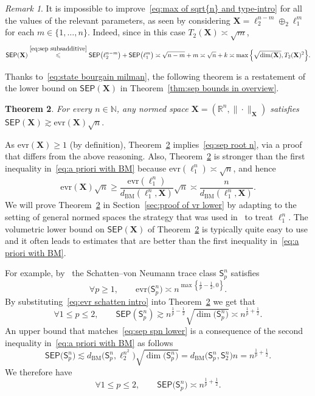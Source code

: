 \documentclass[11pt,reqno]{amsart}
\renewcommand{\le}{\leqslant}
\renewcommand{\ge}{\geqslant}
\newcommand{\evr}{\mathrm{evr}}
\newcommand{\n}{\{1,\ldots,n\}}
\newcommand{\X}{\mathbf X}
\newcommand{\R}{\mathbb R}
\newtheorem{theorem}{Theorem}
\theoremstyle{remark}
\newtheorem{remark}[theorem]{Remark}
\newcommand{\sfS}{\mathsf{S}}
\newcommand{\N}{\mathbb N}
\newcommand{\BM}{\mathrm{BM}}
\renewcommand{\1}{\mathbf 1}
\newcommand{\sep}{\mathsf{SEP}}
\begin{document}
\begin{remark} It is impossible to improve~\eqref{eq:max of sqrt{n} and type-intro} for all the values of the relevant parameters, as seen  by considering $\X=\ell_{2}^{n-m}\oplus_2\ell_1^m$ for each $m\in\n$. Indeed, since in this case $T_2(\X)\asymp \sqrt{m}$,
$$
\sep(\X)\stackrel{\eqref{eq:sep subsadditive}}{\le} \sep\big(\ell_2^{n-m}\big)+\sep\big(\ell_1^m\big)\asymp \sqrt{n-m}+m\asymp \sqrt{n}+k\asymp \max\Big\{\sqrt{\dim(\X)},T_2(\X)^2\Big\}.
$$
\end{remark}

Thanks to~\eqref{eq:state bourgain milman}, the following theorem is a restatement of the lower bound on $\sep(\X)$ in Theorem~\ref{thm:sep bounds in overview}.

\begin{theorem}\label{thm:sep lower evr} For every $n\in \N$, any normed space $\X=(\R^n,\|\cdot\|_\X)$ satisfies $\sep(\X)\gtrsim \evr(\X)\sqrt{n}.
$
\end{theorem}
As $\evr(\X)\ge 1$ (by definition), Theorem~\ref{thm:sep lower evr}  implies~\eqref{eq:sep root n}, via a  proof that differs from the above reasoning. Also, Theorem~\ref{thm:sep lower evr} is stronger than the first inequality in~\eqref{eq:a priori with BM} because $\evr(\ell_1^n)\asymp \sqrt{n}$, and hence
$$
\evr(\X)\sqrt{n}\ge \frac{\evr(\ell_1^n)}{d_{\BM}(\ell_1^n,\X)}\sqrt{n}\asymp \frac{n}{d_{\BM}(\ell_1^n,\X)}.
$$
We will prove Theorem~\ref{thm:sep lower evr} in Section~\ref{sec:proof of vr lower} by adapting to the setting of general normed spaces the strategy that was used in~\cite{CCGGP98} to treat $\ell_1^n$. The volumetric lower bound on $\sep(\X)$ of Theorem~\ref{thm:sep lower evr} is typically quite easy to use and it often leads to  estimates that are better than the first inequality in~\eqref{eq:a priori with BM}.

For example, by~\cite[Proposition~2.2]{Sch82} the  Schatten--von Neumann trace class $\sfS_p^n$ satisfies
\begin{equation}\label{eq:evr schatten intro}
\forall p\ge 1,\qquad \evr\big(\sfS_p^n\big)\asymp n^{\max\left\{\frac{1}{p}-\frac12,0\right\}}.
\end{equation}
By substituting~\eqref{eq:evr schatten intro} into Theorem~\ref{thm:sep lower evr} we  get that
\begin{equation}\label{eq:sep spn lower}
\forall 1\le p\le 2,\qquad \sep(\sfS_p^n)\gtrsim  n^{\frac{1}{p}-\frac12}\sqrt{\dim\big(\sfS_p^n\big)}\asymp  n^{\frac1{p}+\frac12}.
\end{equation}
An upper bound that  matches~\eqref{eq:sep spn lower}  is a consequence of the second inequality in~\eqref{eq:a priori with BM} as follows
$$
\sep\big(\sfS_p^n\big)\lesssim d_{\BM}\big(\sfS_p^n,\ell_2^{n^2}\big)\sqrt{\dim\big(\sfS_p^n\big)} = d_{\BM}\big(\sfS_p^n,\sfS_2^n\big)n=n^{\frac{1}{p}+\frac12}.
$$
We therefore have
$$
\forall 1\le p\le 2,\qquad  \sep\big(\sfS_p^n\big)\asymp n^{\frac{1}{p}+\frac12}.
$$
\end{document}
